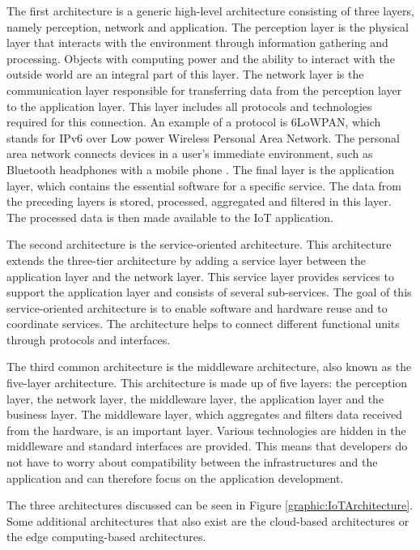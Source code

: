The first architecture is a generic high-level architecture consisting of three layers, namely perception, network and application. The perception layer is the physical layer that interacts with the environment through information gathering and processing. Objects with computing power and the ability to interact with the outside world are an integral part of this layer. The network layer is the communication layer responsible for transferring data from the perception layer to the application layer. This layer includes all protocols and technologies required for this connection. An example of a protocol is 6LoWPAN, which stands for IPv6 over Low power Wireless Personal Area Network. The personal area network connects devices in a user's immediate environment, such as Bluetooth headphones with a mobile phone \cite{website:cloudFlarePAN}. The final layer is the application layer, which contains the essential software for a specific service. The data from the preceding layers is stored, processed, aggregated and filtered in this layer. The processed data is then made available to the IoT application.  

The second architecture is the service-oriented architecture. This architecture extends the three-tier architecture by adding a service layer between the application layer and the network layer. This service layer provides services to support the application layer and consists of several sub-services. The goal of this service-oriented architecture is to enable software and hardware reuse and to coordinate services. The architecture helps to connect different functional units through protocols and interfaces.   


The third common architecture is the middleware architecture, also known as the five-layer architecture. This architecture is made up of five layers: the perception layer, the network layer, the middleware layer, the application layer and the business layer. The middleware layer, which aggregates and filters data received from the hardware, is an important layer. Various technologies are hidden in the middleware and standard interfaces are provided. This means that developers do not have to worry about compatibility between the infrastructures and the application and can therefore focus on the application development. 

The three architectures discussed can be seen in Figure \ref{graphic:IoTArchitecture}. Some additional architectures that also exist are the cloud-based architectures or the edge computing-based architectures.  



